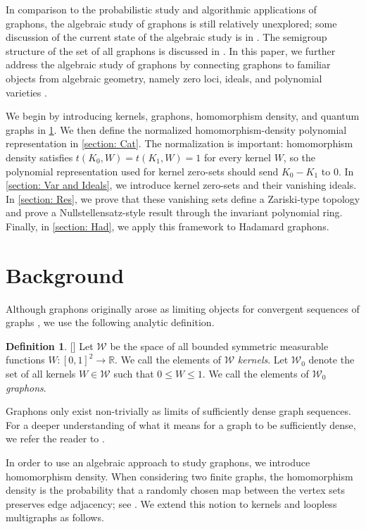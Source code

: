 \documentclass[a4paper,12pt]{article}
\let\cite\parencite
\theoremstyle{definition}
\newtheorem{definition}[lemma]{Definition}
\newcommand\cW{\mathcal{W}}
\newcommand\R{\mathbb{R}}
\begin{document}
In comparison to the probabilistic study and algorithmic applications of graphons, the algebraic study of graphons is still relatively unexplored; some discussion of the current state of the algebraic study is in \cite{hombook}. The semigroup structure of the set of all graphons is discussed in \cite{2021nagy}. In this paper, we further address the algebraic study of graphons by connecting graphons to familiar objects from algebraic geometry, namely zero loci, ideals, and polynomial varieties \cite{hartshorne}.

We begin by introducing kernels, graphons, homomorphism density, and quantum graphs in \cref{section: BG}. We then define the normalized homomorphism-density polynomial representation in \cref{section: Cat}. The normalization is important: homomorphism density satisfies $t(K_0,W)=t(K_1,W)=1$ for every kernel $W$, so the polynomial representation used for kernel zero-sets should send $K_0-K_1$ to $0$. In \cref{section: Var and Ideals}, we introduce kernel zero-sets and their vanishing ideals. In \cref{section: Res}, we prove that these vanishing sets define a Zariski-type topology and prove a Nullstellensatz-style result through the invariant polynomial ring. Finally, in \cref{section: Had}, we apply this framework to Hadamard graphons.

\section{Background}\label{section: BG}

Although graphons originally arose as limiting objects for convergent sequences of graphs \cite{hombook, glasscock2015graphon, glasscock2016graphon, BORGS20081801}, we use the following analytic definition.

\begin{definition}\label{definition:kernel}[\cite{hombook}]
Let $\cW$ be the space of all bounded symmetric measurable functions $W:[0,1]^2\to\R$. We call the elements of $\cW$ \textit{kernels}. Let $\cW_0$ denote the set of all kernels $W\in\cW$ such that $0\leq W\leq 1$. We call the elements of $\cW_0$ \textit{graphons}.
\end{definition}

Graphons only exist non-trivially as limits of sufficiently dense graph sequences. For a deeper understanding of what it means for a graph to be sufficiently dense, we refer the reader to \cite{BORGS20081801, borgs2018sparse}.

In order to use an algebraic approach to study graphons, we introduce homomorphism density. When considering two finite graphs, the homomorphism density is the probability that a randomly chosen map between the vertex sets preserves edge adjacency; see \cite{hombook, BORGS20081801}. We extend this notion to kernels and loopless multigraphs as follows.
\end{document}
